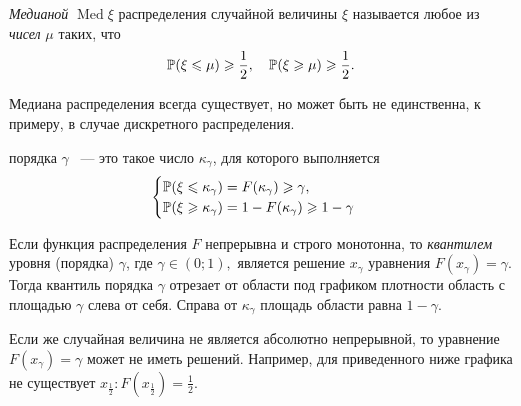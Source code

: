 \begin{defn}
    {\it Медианой} $\operatorname{Med} \xi$ распределения случайной величины $\xi$ называется любое из {\it чисел} $\mu$ таких, что
    \begin{equation*}
        {\mathbb{P}(\xi \leqslant \mu)} \geqslant \frac{1}{2}, ~~~ {\mathbb{P}(\xi \geqslant \mu)} \geqslant \frac{1}{2}.
    \end{equation*}
\end{defn} 

\begin{rmrk}
    Медиана распределения всегда существует, но может быть не единственна, к примеру, в случае дискретного распределения.
\end{rmrk} 

\begin{defn}
{  порядка $\gamma$} ~--- это такое число $\kappa_\gamma$, для которого выполняется 
$$ \begin{cases} {\mathbb{P}(\xi \leqslant \kappa_\gamma)} = F(\kappa_\gamma) \geqslant \gamma, \\
{\mathbb{P}(\xi \geqslant \kappa_\gamma)} = 1 - F(\kappa_\gamma) \geqslant 1 - \gamma \end{cases}
$$
\end{defn}

\begin{rmrk}
    Если функция распределения $F$ непрерывна и строго монотонна, то {\it квантилем} уровня (порядка) $\gamma$, где $\gamma \in (0; 1), $ является решение $x_\gamma$ уравнения $F(x_\gamma) = \gamma.$ 
    Тогда квантиль порядка $\gamma$ отрезает от области под графиком плотности область с площадью $\gamma$ слева от себя. Справа от $\kappa_\gamma$ площадь области равна $1 - \gamma$.
    
    Если же случайная величина не является абсолютно непрерывной, то уравнение $F(x_\gamma) = \gamma$ может не иметь решений. Например, для приведенного ниже графика не существует $x_{\frac{1}{2}}: F(x_{\frac{1}{2}}) = \frac{1}{2}$.
        
    \medskip\hfill\break
    \begin{center}
    \end{center}
\end{rmrk} 

